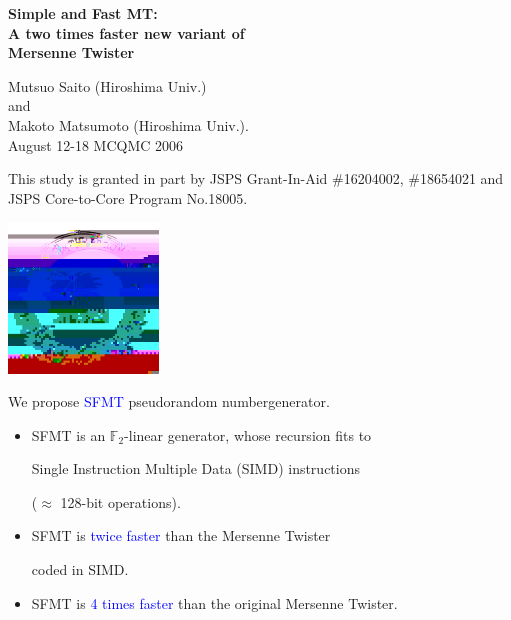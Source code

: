 \documentclass[a4j,12pt,landscape]{jarticle}
\title{}
\author{}
\date{\today}
\def\F2{{\mathbb F}_2}
\begin{document}
\Huge

\begin{center}
{\bf Simple and Fast MT:\\
  A two times faster new variant of \\
  Mersenne Twister}
\vspace{1cm}

Mutsuo Saito (Hiroshima Univ.) \\
and \\
Makoto Matsumoto (Hiroshima Univ.).\\
August 12-18 MCQMC 2006
\end{center}
\vspace{\fill}
\parbox{19cm}{\Large
This study is granted in part by
JSPS Grant-In-Aid \#16204002, \#18654021
and JSPS Core-to-Core Program No.18005.
}
\parbox{2cm}{\vskip 1cm \includegraphics*[width=4cm,height=4cm]{logo.jpg}}

\newpage
We propose \textcolor{blue}{SFMT} pseudorandom numbergenerator.

\begin{itemize}
\item 
SFMT is an $\F2$-linear generator,
whose recursion fits to 

Single Instruction Multiple Data (SIMD)
instructions 

($\approx$ 128-bit operations).

\item
SFMT is \textcolor{blue}{twice faster} than the Mersenne Twister

coded in SIMD.

\item
SFMT is \textcolor{blue}{4 times faster} than the original Mersenne Twister.

\end{itemize}

\end{document}
